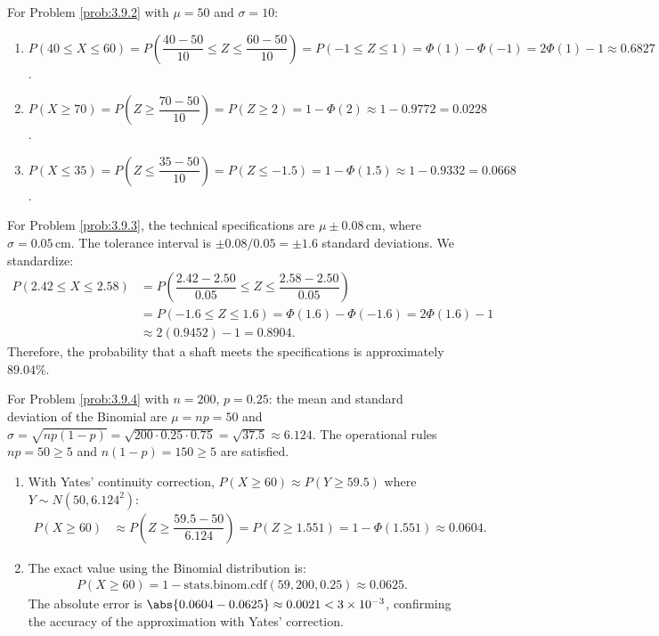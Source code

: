 \begin{solucion}
	\label{sol:3.9.2}
	For Problem \ref{prob:3.9.2} with $\mu = 50$ and $\sigma = 10$:
	\begin{enumerate}
		\item $P(40 \le X \le 60) = P\left(\dfrac{40-50}{10} \le Z \le \dfrac{60-50}{10}\right) = P(-1 \le Z \le 1) = \Phi(1) - \Phi(-1) = 2\Phi(1) - 1 \approx 0.6827$.
		\item $P(X \ge 70) = P\left(Z \ge \dfrac{70-50}{10}\right) = P(Z \ge 2) = 1 - \Phi(2) \approx 1 - 0.9772 = 0.0228$.
		\item $P(X \le 35) = P\left(Z \le \dfrac{35-50}{10}\right) = P(Z \le -1.5) = 1 - \Phi(1.5) \approx 1 - 0.9332 = 0.0668$.
	\end{enumerate}
\end{solucion}

\begin{solucion}
	\label{sol:3.9.3}
	For Problem \ref{prob:3.9.3}, the technical specifications are $\mu \pm 0.08\,\text{cm}$, where $\sigma = 0.05\,\text{cm}$. The tolerance interval is $\pm 0.08/0.05 = \pm 1.6$ standard deviations. We standardize:
	\begin{align*}
		P(2.42 \le X \le 2.58) &= P\left(\dfrac{2.42 - 2.50}{0.05} \le Z \le \dfrac{2.58 - 2.50}{0.05}\right) \\
		&= P(-1.6 \le Z \le 1.6) = \Phi(1.6) - \Phi(-1.6) = 2\Phi(1.6) - 1 \\
		&\approx 2(0.9452) - 1 = 0.8904.
	\end{align*}
	Therefore, the probability that a shaft meets the specifications is approximately $89.04\%$.
\end{solucion}

\begin{solucion}
	\label{sol:3.9.4}
	For Problem \ref{prob:3.9.4} with $n = 200$, $p = 0.25$: the mean and standard deviation of the Binomial are $\mu = np = 50$ and $\sigma = \sqrt{np(1-p)} = \sqrt{200 \cdot 0.25 \cdot 0.75} = \sqrt{37.5} \approx 6.124$. The operational rules $np = 50 \ge 5$ and $n(1-p) = 150 \ge 5$ are satisfied.
	\begin{enumerate}
		\item With Yates' continuity correction, $P(X \ge 60) \approx P(Y \ge 59.5)$ where $Y \sim N(50, 6.124^{2})$:
		\begin{align*}
			P(X \ge 60) &\approx P\left(Z \ge \dfrac{59.5 - 50}{6.124}\right) = P(Z \ge 1.551) = 1 - \Phi(1.551) \approx 0.0604.
		\end{align*}
		\item The exact value using the Binomial distribution is:
		\begin{align*}
			P(X \ge 60) = 1 - \text{stats.binom.cdf}(59, 200, 0.25) \approx 0.0625.
		\end{align*}
		The absolute error is $\abs{0.0604 - 0.0625} \approx 0.0021 < 3 \times 10^{-3}$, confirming the accuracy of the approximation with Yates' correction.
	\end{enumerate}
\end{solucion}

